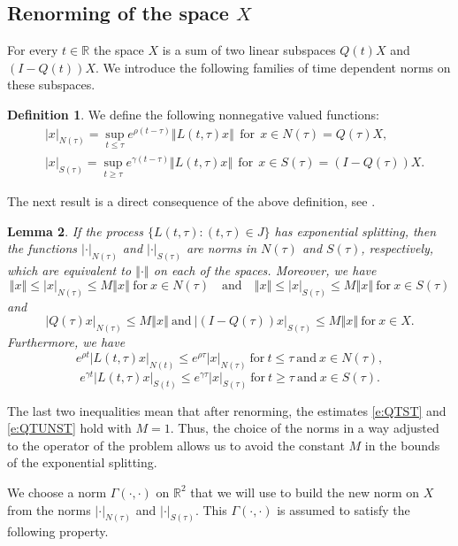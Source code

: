 \documentclass[a4paper,11pt,reqno]{amsart}
\theoremstyle{plain}
\newtheorem{lem}{Lemma}[section]
\theoremstyle{definition}
\newtheorem{defn}[lem]{Definition}
\numberwithin{equation}{section}
\newcommand{\R}{\mathbb{R}}
\newcommand{\norm}[1]{\left\Vert#1\right\Vert}
\renewcommand{\geq}{\geqslant}
\renewcommand{\leq}{\leqslant}
\begin{document}
 \subsection{Renorming of the space \texorpdfstring{$X$}.} For every $t\in \R$ the space $X$ is a sum of two linear subspaces $Q(t)X$ and $(I-Q(t))X$. We introduce the following families of time dependent norms on these subspaces.
\begin{defn}
We define the following nonnegative valued functions: 
\begin{align}&\label{e:NORMNT}
|x|_{N(\tau)}=\sup_{t\leq\tau}e^{\rho(t-\tau)}\norm{L(t,\tau)x}\ \ \text{for}\ \  x\in N(\tau)=Q(\tau)X,
\\ &\label{e:NORMST}
|x|_{S(\tau)}=\sup_{t\geq\tau} e^{\gamma(t-\tau)}\norm{L(t,\tau)x}\ \ \textrm{for}\ \ x\in S(\tau)=(I-Q(\tau))X.
\end{align}
\end{defn}
The next result is a direct consequence of the above definition, see \cite[Lemma 6.8]{CLR}. 
\begin{lem}\label{lem:norms}
If the process  $\{L(t,\tau)\colon (t,\tau)\in J\}$ has exponential splitting, then
the functions $|\cdot|_{N(\tau)}$ and $|\cdot|_{S(\tau)}$ are norms in $N(\tau)$ and $S(\tau)$, respectively, which are equivalent to $\norm{\cdot}$ on each of the spaces. Moreover, we have
\begin{equation}\label{e:EQUIVNS}
\norm{x}\leq|x|_{N(\tau)}\leq M\norm{x}\ \text{for}\ x\in N(\tau)\quad\text{and}\quad  \norm{x}\leq|x|_{S(\tau)}\leq M\norm{x}\ \text{for}\ x\in S(\tau)
\end{equation}
and
\begin{equation}\label{e:QI-QONX}
|Q(\tau)x|_{N(\tau)}\leq M\norm{x}\ \text{and}\  |(I-Q(\tau))x|_{S(\tau)}\leq M\norm{x}\ \text{for}\  x\in X.
\end{equation}
Furthermore, we have
$$e^{\rho t}|L(t,\tau)x|_{N(t)}\leq e^{\rho\tau}|x|_{N(\tau)}\ \text{for}\  t\leq\tau \ \text{and}\  x\in N(\tau),$$
$$e^{\gamma t}|L(t,\tau)x|_{S(t)}\leq e^{\gamma\tau}|x|_{S(\tau)}\ \text{for}\  t\geq\tau\ \text{and}\  x\in S(\tau).$$
\end{lem}
The last two inequalities mean that after renorming, the estimates \eqref{e:QTST} and \eqref{e:QTUNST} hold with $M=1$. Thus, the choice of the norms in a way adjusted to the operator of the problem allows us to avoid the constant $M$ in the bounds of the exponential splitting. 

We choose a norm $\Gamma(\cdot,\cdot)$ on $\R^2$ that we will use to build the new norm on $X$ from the norms $|\cdot|_{N(\tau)}$ and $|\cdot|_{S(\tau)}$. This $\Gamma(\cdot,\cdot)$ is assumed to satisfy the following property. 
\end{document}
